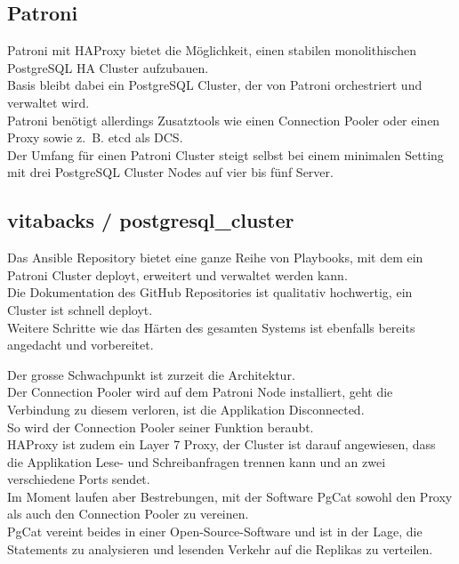 \begin{flushleft}
    \subsection{Patroni}
    Patroni mit \Gls{HAProxy} bietet die Möglichkeit, einen stabilen monolithischen \Gls{PostgreSQL HA Cluster} aufzubauen.\\
    Basis bleibt dabei ein \Gls{PostgreSQL Cluster}, der von Patroni orchestriert und verwaltet wird.\\
    Patroni benötigt allerdings Zusatztools wie einen \Gls{Connection Pooler} oder einen Proxy sowie z. B. \gls{etcd} als DCS.\\
    Der Umfang für einen Patroni Cluster steigt selbst bei einem minimalen Setting mit drei \Gls{PostgreSQL Cluster} Nodes auf vier bis fünf Server.
    \subsection{vitabacks / postgresql\_cluster}
    Das \Gls{Ansible} Repository bietet eine ganze Reihe von Playbooks, mit dem ein Patroni Cluster deployt, erweitert und verwaltet werden kann.\\
    Die Dokumentation des \Gls{GitHub} Repositories ist qualitativ hochwertig, ein Cluster ist schnell deployt.\\
    Weitere Schritte wie das Härten des gesamten Systems ist ebenfalls bereits angedacht und vorbereitet.
\end{flushleft}
\begin{flushleft}
    Der grosse Schwachpunkt ist zurzeit die Architektur.\\
    Der \Gls{Connection Pooler} wird auf dem Patroni Node installiert, geht die Verbindung zu diesem verloren, ist die Applikation Disconnected.\\
    So wird der \Gls{Connection Pooler} seiner Funktion beraubt.\\
    \Gls{HAProxy} ist zudem ein Layer 7 Proxy, der Cluster ist darauf angewiesen, dass die Applikation Lese- und Schreibanfragen trennen kann und an zwei verschiedene Ports sendet.\\
    Im Moment laufen aber Bestrebungen, mit der Software PgCat sowohl den Proxy als auch den \Gls{Connection Pooler} zu vereinen.\\
    PgCat vereint beides in einer Open-Source-Software und ist in der Lage, die Statements zu analysieren und lesenden Verkehr auf die Replikas zu verteilen.\\
\end{flushleft}